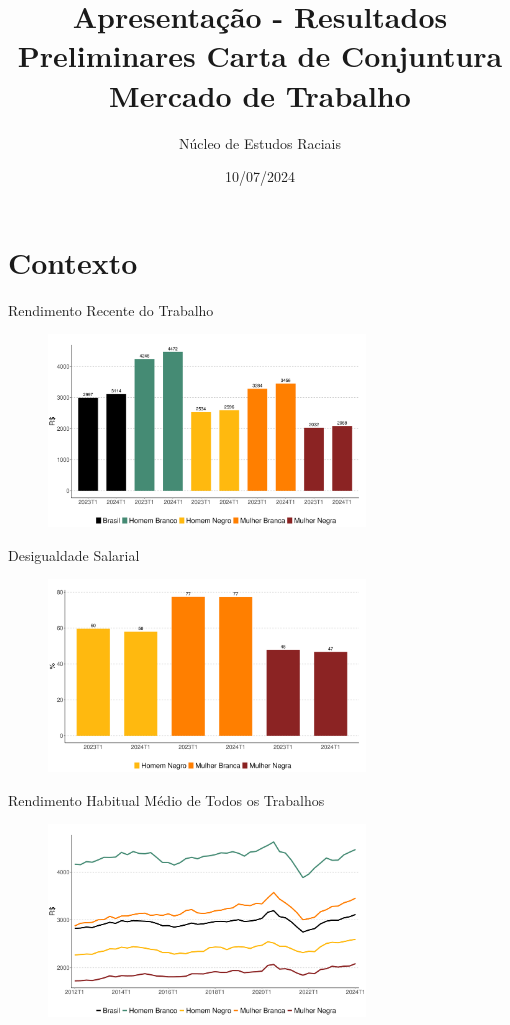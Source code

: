 \documentclass[10pt, xcolor=x11names,compress]{beamer}
\author{Núcleo de Estudos Raciais}
\title{Apresentação - Resultados Preliminares Carta de Conjuntura Mercado de Trabalho}
\institute{Insper}\date{10/07/2024}
\begin{document}
	\begin{frame}
		\titlepage
	\end{frame}
	
	
	\section{Contexto} 
	\begin{frame}{Rendimento Recente do Trabalho}
		\begin{figure}
			\centering
			\includegraphics[width = 0.75\textwidth]{figures_output/rendimento_habitual.pdf}
		\end{figure}
	\end{frame}			
	
	\begin{frame}{Desigualdade Salarial}
		\begin{figure}
			\centering
			\includegraphics[width = 0.75\textwidth]{figures_output/frac_rendimento_habitual.pdf}
		\end{figure}
	\end{frame}			
	
	\begin{frame}{Rendimento Habitual Médio de Todos os Trabalhos}
		\begin{figure}
			\centering
			\includegraphics[width = 0.75\textwidth]{figures_output/rendimento_habitual_br_gen_raca.pdf}
		\end{figure}
	\end{frame}	
	
\end{document}
